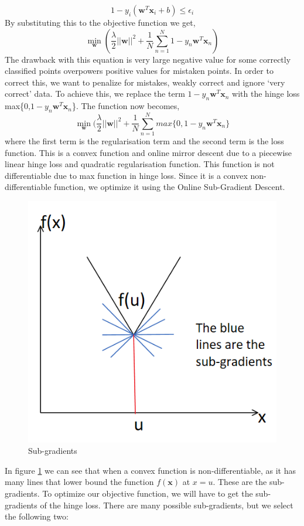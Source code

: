 \documentclass[11pt]{article}
\begin{document}
 \[ 1- y_i(\mathbf{w}^{T}\mathbf{x}_i+b)\leq \epsilon_i \]
 By substituting this to the objective function we get,
  \[ \min_\mathbf{w}(\frac{\lambda}{2}||\mathbf{w}||^2+\frac{1}{N}\sum_{n=1}^{N}1-y_n\mathbf{w}^T\mathbf{x}_n) \]
  The drawback with this equation is very large negative value for some correctly classified points overpowers positive values for mistaken points. In order to correct this, we want to penalize for mistakes, weakly correct and ignore ‘very correct’ data.
To achieve this, we replace the term $1-y_n\mathbf{w}^T\mathbf{x}_n$ with the hinge loss max\{0,$1-y_n\mathbf{w}^T\mathbf{x}_n$\}. The function now becomes,\[ \min_\mathbf{w}(\frac{\lambda}{2}||\mathbf{w}||^2+\frac{1}{N}\sum_{n=1}^{N}max\{0,1-y_n\mathbf{w}^T\mathbf{x}_n\} \]
where the first term is the regularisation term and the second term is the loss function. This is a convex function and online mirror descent due to a piecewise linear hinge loss and quadratic regularisation function. This function is not differentiable due to max function in hinge loss. Since it is a convex non-differentiable function, we optimize it using the Online Sub-Gradient Descent.
\begin{figure}[h!]
    \centering
  \includegraphics[scale=0.7]{fig6.PNG}
  \caption{Sub-gradients}
  \label{fig:SG}
\end{figure}
In figure \ref{fig:SG} we can see that when a convex function is non-differentiable, as it has many lines that lower bound the function $f(\mathbf{x})$ at $x=u$. These are the sub-gradients. To optimize our objective function, we will have to get the sub-gradients of the hinge loss. There are many possible sub-gradients, but we select the following two:
\end{document}
